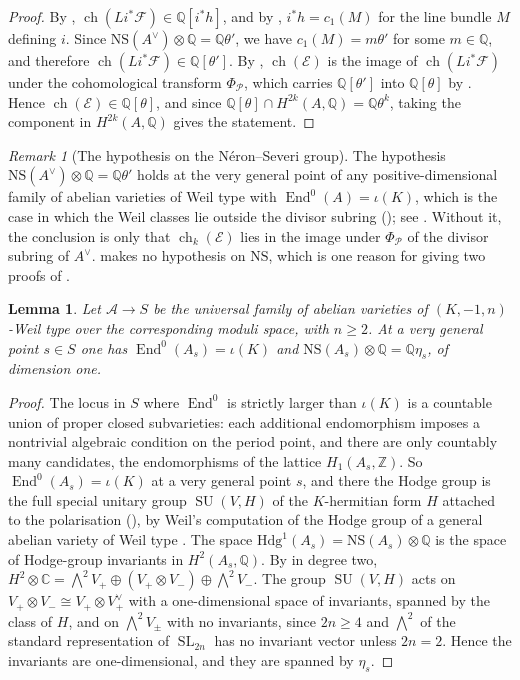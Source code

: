 \documentclass[11pt,reqno]{amsart}
\theoremstyle{plain}
\newtheorem{lemma}[theorem]{Lemma}
\theoremstyle{definition}
\theoremstyle{remark}
\newtheorem{remark}[theorem]{Remark}
\newcommand{\QQ}{\mathbb{Q}}
\newcommand{\ZZ}{\mathbb{Z}}
\newcommand{\CC}{\mathbb{C}}
\newcommand{\Av}{A^{\vee}}
\newcommand{\cP}{\mathcal{P}}
\newcommand{\cF}{\mathcal{F}}
\newcommand{\cE}{\mathcal{E}}
\newcommand{\Hdg}{\mathrm{Hdg}}
\newcommand{\NS}{\mathrm{NS}}
\DeclareMathOperator{\ch}{ch}
\DeclareMathOperator{\End}{End}
\DeclareMathOperator{\SL}{SL}
\DeclareMathOperator{\SU}{SU}
\begin{document}
\begin{proof}
By , $\ch(Li^{*}\cF)\in\QQ[i^{*}h]$, and by
, $i^{*}h=c_{1}(M)$ for the line bundle $M$ defining $i$.
Since $\NS(\Av)\otimes\QQ=\QQ\theta'$, we have $c_{1}(M)=m\theta'$ for some
$m\in\QQ$, and therefore $\ch(Li^{*}\cF)\in\QQ[\theta']$. By
, $\ch(\cE)$ is the image of $\ch(Li^{*}\cF)$ under the
cohomological transform $\Phi_{\cP}$, which carries $\QQ[\theta']$ into
$\QQ[\theta]$ by . Hence $\ch(\cE)\in\QQ[\theta]$, and
since $\QQ[\theta]\cap H^{2k}(A,\QQ)=\QQ\theta^{k}$, taking the component in
$H^{2k}(A,\QQ)$ gives the statement.
\end{proof}

\begin{remark}[The hypothesis on the N\'eron--Severi group]\label{rem:NShyp}
The hypothesis $\NS(\Av)\otimes\QQ=\QQ\theta'$ holds at the very general point
of any positive-dimensional family of abelian varieties of Weil type with
$\End^{0}(A)=\iota(K)$, which is the case in which the Weil classes lie
outside the divisor subring (); see .
Without it, the conclusion is only that $\ch_{k}(\cE)$ lies in the image
under $\Phi_{\cP}$ of the divisor subring of $\Av$. 
makes no hypothesis on $\NS$, which is one reason for giving two proofs of
.
\end{remark}

\begin{lemma}\label{lem:genericNS}
Let $\mathcal{A}\to S$ be the universal family of abelian varieties of
$(K,-1,n)$-Weil type over the corresponding moduli space, with $n\ge2$. At a
very general point $s\in S$ one has $\End^{0}(A_{s})=\iota(K)$ and
$\NS(A_{s})\otimes\QQ=\QQ\eta_{s}$, of dimension one.
\end{lemma}

\begin{proof}
The locus in $S$ where $\End^{0}$ is strictly larger than $\iota(K)$ is a
countable union of proper closed subvarieties: each additional endomorphism
imposes a nontrivial algebraic condition on the period point, and there are
only countably many candidates, the endomorphisms of the lattice
$H_{1}(A_{s},\ZZ)$. So $\End^{0}(A_{s})=\iota(K)$ at a very general point
$s$, and there the Hodge group is the full special unitary group
$\SU(V,H)$ of the $K$-hermitian form $H$ attached to the
polarisation (), by Weil's computation of the Hodge group of a general abelian
variety of Weil type \cite{Weil77}. The space
$\Hdg^{1}(A_{s})=\NS(A_{s})\otimes\QQ$ is the space of Hodge-group invariants
in $H^{2}(A_{s},\QQ)$. By  in degree two,
$H^{2}\otimes\CC=\bigwedge^{2}V_{+}\oplus(V_{+}\otimes V_{-})\oplus\bigwedge^{2}V_{-}$.
The group $\SU(V,H)$ acts on $V_{+}\otimes V_{-}\cong V_{+}\otimes V_{+}^{\vee}$
with a one-dimensional space of invariants, spanned by the class of $H$, and on
$\bigwedge^{2}V_{\pm}$ with no invariants, since $2n\ge4$ and $\bigwedge^{2}$
of the standard representation of $\SL_{2n}$ has no invariant vector
unless $2n=2$. Hence the invariants are one-dimensional, and they are spanned
by $\eta_{s}$.
\end{proof}
\end{document}
